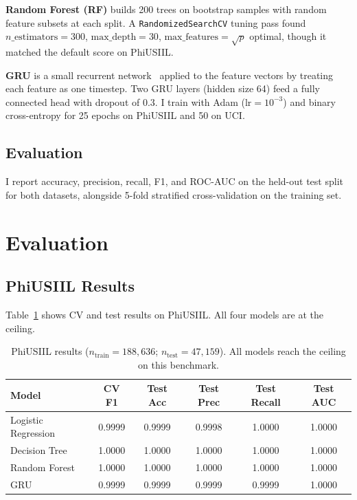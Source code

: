 \documentclass{article}
\begin{document}
\textbf{Random Forest (RF)} builds 200 trees on bootstrap samples with random feature subsets at each split.
A \texttt{RandomizedSearchCV} tuning pass found $n\_\text{estimators} = 300$, $\text{max\_depth} = 30$, $\text{max\_features} = \sqrt{p}$ optimal, though it matched the default score on PhiUSIIL.

\textbf{GRU} is a small recurrent network~\cite{cho2014} applied to the feature vectors by treating each feature as one timestep.
Two GRU layers (hidden size 64) feed a fully connected head with dropout of 0.3.
I train with Adam ($\text{lr} = 10^{-3}$) and binary cross-entropy for 25 epochs on PhiUSIIL and 50 on UCI.

\subsection{Evaluation}

I report accuracy, precision, recall, F1, and ROC-AUC on the held-out test split for both datasets, alongside 5-fold stratified cross-validation on the training set.

\section{Evaluation}
\label{sec:eval}

\subsection{PhiUSIIL Results}

Table~\ref{tab:phiusiil} shows CV and test results on PhiUSIIL.
All four models are at the ceiling.

\begin{table}[ht]
\caption{PhiUSIIL results ($n_\text{train} = 188{,}636$; $n_\text{test} = 47{,}159$). All models reach the ceiling on this benchmark.}
\label{tab:phiusiil}
\centering
\begin{tabular}{lccccc}
\toprule
Model & CV F1 & Test Acc & Test Prec & Test Recall & Test AUC \\
\midrule
Logistic Regression & 0.9999 & 0.9999 & 0.9998 & 1.0000 & 1.0000 \\
Decision Tree       & 1.0000 & 1.0000 & 1.0000 & 1.0000 & 1.0000 \\
Random Forest       & 1.0000 & 1.0000 & 1.0000 & 1.0000 & 1.0000 \\
GRU                 & 0.9999 & 0.9999 & 0.9999 & 0.9999 & 1.0000 \\
\bottomrule
\end{tabular}
\end{table}
\end{document}
